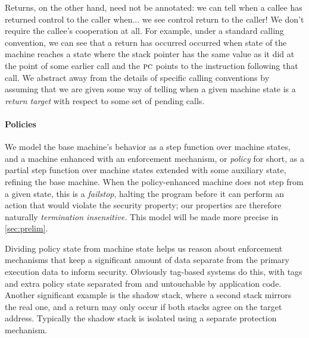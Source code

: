 \documentclass[acmsmall,review,anonymous]{acmart}\settopmatter{printfolios=true,printccs=false,printacmref=false}
\begin{document}
Returns, on the other hand, need not be annotated: we can tell when a callee
has returned control to the caller when... we see control return to the
caller! We don't require the callee's cooperation at all.
For example, under a standard calling convention, we can see that a
return has occurred occurred when state of the machine reaches a state where
the stack pointer has the same value as it did at the point of some earlier
call and the $\textsc{pc}$ points to the instruction following that call.  We
abstract away from the details of specific calling conventions by assuming
that we are given some way of telling when a given machine state is a
{\em return target} with respect to some set of pending calls.


\paragraph*{Policies}
We model the base machine's behavior as a step function over machine states,
and a machine
enhanced with an enforcement mechanism, or {\em policy} for short, as a
partial step function over machine states extended with some
auxiliary state, refining the base machine. When the policy-enhanced machine
does not step from a given state, this is a {\em failstop}, halting the program before it can perform an
action that would violate the security property;
our properties are therefore naturally \emph{termination insensitive.}
This model will be made more precise in \cref{sec:prelim}.

Dividing policy state from machine state helps us reason about
enforcement mechanisms that keep a significant amount of data separate from the
primary execution data to inform security. Obviously tag-based systems do this,
with tags and extra policy state separated from and untouchable by application code.
Another significant example is the shadow stack, where a second stack
mirrors the real one, and a return may only occur if both stacks agree on the
target address. Typically the shadow stack is isolated using a separate protection
mechanism.
\end{document}
